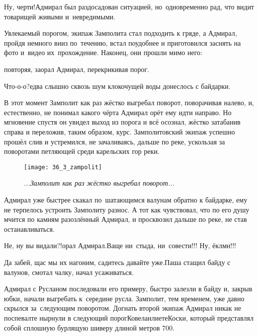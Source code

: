 \diagdash Ну, черти!\mdash Адмирал был раздосадован ситуацией, но~одновременно рад, что видит товарищей живыми и~невредимыми.

Увлекаемый порогом, экипаж Замполита стал подходить к гряде, а Адмирал, пройдя немного вниз по~течению, встал поудобнее и приготовился заснять на фото и~видео их~прохождение. Наконец, они прошли мимо него:

\mdash повторяя, заорал Адмирал, перекрикивая порог.

\diagdash Что-о-о?\mdash едва слышно сквозь шум клокочущей воды донеслось с байдарки.


В этот момент Замполит как раз жёстко выгребал поворот, поворачивая налево, и, естественно, не понимал какого чёрта Адмирал орёт ему идти направо. Но мгновение спустя он увидел выход из порога и всё осознал, жёстко затабанив справа и переложив, таким образом, курс. Замполитовский экипаж успешно прошёл слив и устремился, не зачаливаясь, дальше по реке, ускользая за поворотами петляющей среди карельских гор реки.  %
\begin{figure}[h]
	\centering
	\texttt{[image: 36\_3\_zampolit]}
	\caption{\small\textit{...Замполит как раз жёстко выгребал поворот...}}
\end{figure}

Адмирал уже быстрее скакал по~шатающимся валунам обратно к байдарке, ему не терпелось устроить Замполиту разнос. А тот как чувствовал, что по его душу мчится по камням разозлённый Адмирал, и просквозил дальше по реке, не став останавливаться.

\diagdash Не, ну вы видали?!\mdash орал Адмирал.\mdash Ваще ни~стыда, ни~совести!!! Ну, ёклмн!!!

\diagdash Да забей, щас мы их нагоним, садитесь давайте уже.\mdash Паша стащил байду с валунов, смотал чалку, начал усаживаться. 

Адмирал с Русланом последовали его примеру, быстро залезли в байду и, закрыв юбки, начали выгребать к~середине русла. Замполит, тем временем, уже давно скрылся за~следующим поворотом. Догнать второй экипаж Адмирал никак не поспевал\mdash те нырнули в следующий порог\mdash Ковеланлиете\sdash Коски, который представлял собой сплошную бурлящую шиверу длиной метров 700.

